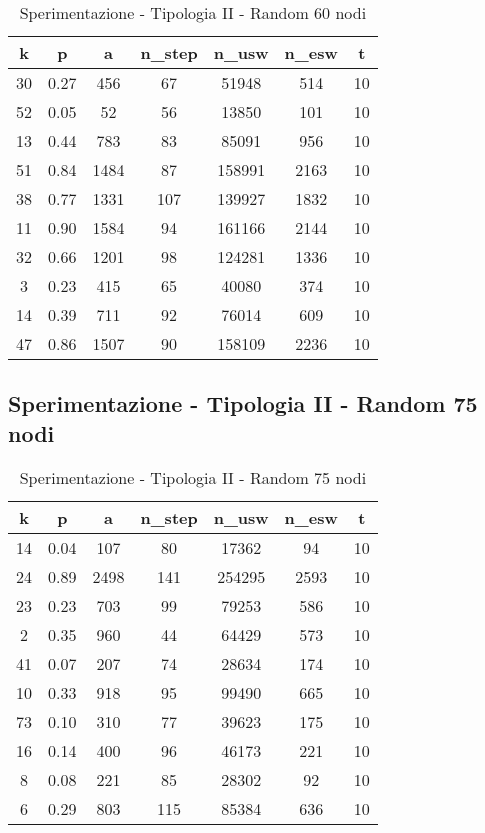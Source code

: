 \begin{table}[H]
\centering
\begin{tabular}{|c|c|c|c|c|c|c|}
\hline
\textbf{k} & \textbf{p} & \textbf{a} & \textbf{n\_step} & \textbf{n\_usw} & \textbf{n\_esw} & \textbf{t} \\ \hline
30 & 0.27 & 456 & 67 & 51948 & 514 & 10 \\ \hline
52 & 0.05 & 52 & 56 & 13850 & 101 & 10 \\ \hline
13 & 0.44 & 783 & 83 & 85091 & 956 & 10 \\ \hline
51 & 0.84 & 1484 & 87 & 158991 & 2163 & 10 \\ \hline
38 & 0.77 & 1331 & 107 & 139927 & 1832 & 10 \\ \hline
11 & 0.90 & 1584 & 94 & 161166 & 2144 & 10 \\ \hline
32 & 0.66 & 1201 & 98 & 124281 & 1336 & 10 \\ \hline
3 & 0.23 & 415 & 65 & 40080 & 374 & 10 \\ \hline
14 & 0.39 & 711 & 92 & 76014 & 609 & 10 \\ \hline
47 & 0.86 & 1507 & 90 & 158109 & 2236 & 10 \\ \hline
\end{tabular}
\caption{Sperimentazione - Tipologia II - Random 60 nodi}
\label{tab:sperimentazione-tipo1-60nodi}
\end{table}

\subsection{Sperimentazione - Tipologia II - Random 75 nodi}

\begin{table}[H]
\centering
\begin{tabular}{|c|c|c|c|c|c|c|}
\hline
\textbf{k} & \textbf{p} & \textbf{a} & \textbf{n\_step} & \textbf{n\_usw} & \textbf{n\_esw} & \textbf{t} \\ \hline
14 & 0.04 & 107 & 80 & 17362 & 94 & 10 \\ \hline
24 & 0.89 & 2498 & 141 & 254295 & 2593 & 10 \\ \hline
23 & 0.23 & 703 & 99 & 79253 & 586 & 10 \\ \hline
2 & 0.35 & 960 & 44 & 64429 & 573 & 10 \\ \hline
41 & 0.07 & 207 & 74 & 28634 & 174 & 10 \\ \hline
10 & 0.33 & 918 & 95 & 99490 & 665 & 10 \\ \hline
73 & 0.10 & 310 & 77 & 39623 & 175 & 10 \\ \hline
16 & 0.14 & 400 & 96 & 46173 & 221 & 10 \\ \hline
8 & 0.08 & 221 & 85 & 28302 & 92 & 10 \\ \hline
6 & 0.29 & 803 & 115 & 85384 & 636 & 10 \\ \hline
\end{tabular}
\caption{Sperimentazione - Tipologia II - Random 75 nodi}
\label{tab:sperimentazione-tipo1-75nodi}
\end{table}

